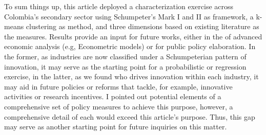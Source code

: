 \documentclass[12pt,a4paper]{article}
\begin{document}
To sum things up, this article deployed a characterization exercise across Colombia’s secondary sector using Schumpeter’s Mark I and II as framework, a k-means clustering as method, and three dimensions based on existing literature as the measures. Results provide an input for future works, either in the of advanced economic analysis (e.g, Econometric models) or for public policy elaboration. In the former, as industries are now classified under a Schumpeterian pattern of innovation, it may serve as the starting point for a probabilistic or regression exercise, in the latter, as we found who drives innovation within each industry, it may aid in future policies or reforms that tackle, for example, innovative activities or research incentives. I pointed out potential elements of a comprehensive set of policy measures to achieve this purpose, however, a comprehensive detail of each would exceed this article’s purpose. Thus, this gap may serve as another starting point for future inquiries on this matter. 


\pagebreak
\end{document}
